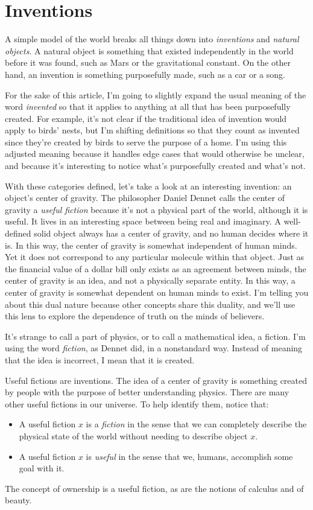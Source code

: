 \documentclass[11pt, oneside]{article}   	%
\begin{document}
\section{Inventions}

A simple model of the world breaks all things down into {\em inventions} and
{\em natural objects}.
A natural object is something that existed independently in the
world before it was found, such as Mars or the gravitational constant.
On the other hand, an
invention is something purposefully made, such as
a car or a song.

For the sake of this article, I'm going to slightly expand
the usual meaning of the word {\em invented} so that it applies
to anything at all that has been purposefully created.
For example,
it's not clear if the traditional idea of invention would apply to birds' nests,
but I'm shifting definitions so that they count as invented since
they're
created by birds to serve the purpose of a
home.
I'm using this adjusted meaning because it handles edge cases that would
otherwise be unclear, and because it's interesting to notice
what's purposefully created and what's not.

With these categories defined,
let's take a look at an interesting invention: an object's
center of gravity.
The philosopher Daniel Dennet calls the center of gravity
a {\em useful fiction}
because it's not a physical part of the world, although it is useful.
It lives in an interesting space between being real and imaginary.
A well-defined solid object always has a center of gravity,
and no human decides where it is.
In this way, the center of gravity
is somewhat independent of human minds.
Yet it does not correspond to any particular molecule within that object.
Just as the financial value of a dollar bill only exists as an agreement between
minds, the center of gravity is an idea, and not a physically separate
entity.
In this way, a center of gravity is somewhat dependent
on human minds to exist.
I'm telling you about this dual nature because
other concepts share this duality, and we'll use this lens to explore
the dependence of truth on the minds of believers.

It's strange to call a part of physics, or to call a mathematical idea, a
fiction. 
I'm using the word {\em fiction}, as Dennet did, in a
nonstandard way.
Instead of meaning that the idea is incorrect, I mean that it is created.

Useful fictions are inventions.
The idea of a center of gravity is something created by
people with the purpose of better understanding physics.
There are many other useful fictions in our universe. To help identify them,
notice that:
\begin{itemize}
    \item A useful fiction $x$ is a {\em fiction}
        in the sense that we can completely
        describe the physical state of the world without needing to describe
        object $x$.
    \item A useful fiction $x$ is {\em useful} in the sense that we, humans,
        accomplish some goal with it.
\end{itemize}
The concept of ownership is a useful fiction, as are the notions of
calculus and of beauty.
\end{document}

